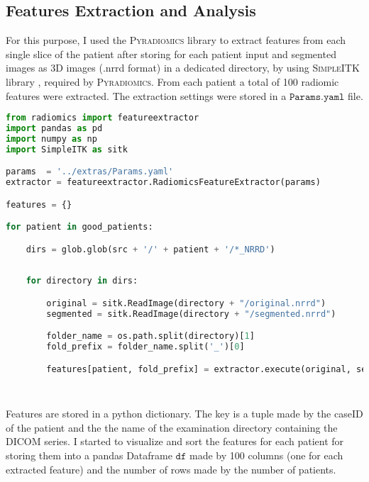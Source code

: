 \documentclass{standalone}
\begin{document}
\subsection{Features Extraction and Analysis}

For this purpose, I used the \textsc{Pyradiomics} library\cite{Pyradiomics} to extract features from each single slice of the patient after storing for each patient input and segmented images as 3D images (.nrrd format) in a dedicated directory, by using \textsc{SimpleITK} library \cite{SimpleITK}, required by \textsc{Pyradiomics}. 
From each patient a total of 100 radiomic features were extracted.
The extraction settings were stored in a $\mathtt{Params.yaml}$ file.
\begin{lstlisting}[language = python, caption=Features extraction implementation]
from radiomics import featureextractor
import pandas as pd
import numpy as np
import SimpleITK as sitk

params  = '../extras/Params.yaml'
extractor = featureextractor.RadiomicsFeatureExtractor(params)

features = {}

for patient in good_patients:

    dirs = glob.glob(src + '/' + patient + '/*_NRRD')
    
    
    for directory in dirs:

        original = sitk.ReadImage(directory + "/original.nrrd")
        segmented = sitk.ReadImage(directory + "/segmented.nrrd")

        folder_name = os.path.split(directory)[1]
        fold_prefix = folder_name.split('_')[0]

        features[patient, fold_prefix] = extractor.execute(original, segmented)

    
\end{lstlisting}

Features are stored in a python dictionary.
The key is a tuple made by the caseID of the patient and the the name of the examination directory containing the DICOM series.
I started to visualize and sort the features for each patient for storing them into a pandas Dataframe $\mathtt{df}$ made by 100 columns (one for each extracted feature) and the number of rows made by the number of patients.
\end{document}
